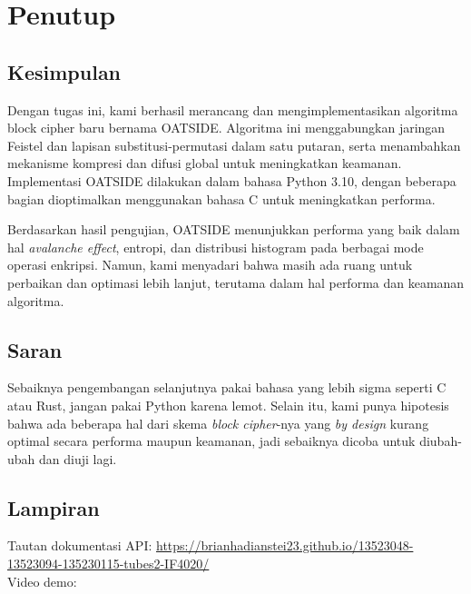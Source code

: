 \section{Penutup}
\subsection{Kesimpulan}
Dengan tugas ini, kami berhasil merancang dan mengimplementasikan algoritma block cipher baru bernama OATSIDE. Algoritma ini menggabungkan jaringan Feistel dan lapisan substitusi-permutasi dalam satu putaran, serta menambahkan mekanisme kompresi dan difusi global untuk meningkatkan keamanan. Implementasi OATSIDE dilakukan dalam bahasa Python 3.10, dengan beberapa bagian dioptimalkan menggunakan bahasa C untuk meningkatkan performa.

Berdasarkan hasil pengujian, OATSIDE menunjukkan performa yang baik dalam hal \textit{avalanche effect}, entropi, dan distribusi histogram pada berbagai mode operasi enkripsi. Namun, kami menyadari bahwa masih ada ruang untuk perbaikan dan optimasi lebih lanjut, terutama dalam hal performa dan keamanan algoritma.

\subsection{Saran}
Sebaiknya pengembangan selanjutnya pakai bahasa yang lebih sigma seperti C atau Rust, jangan pakai Python karena lemot. Selain itu, kami punya hipotesis bahwa ada beberapa hal dari skema \textit{block cipher}-nya yang \textit{by design} kurang optimal secara performa maupun keamanan, jadi sebaiknya dicoba untuk diubah-ubah dan diuji lagi. 

\subsection{Lampiran}
Tautan dokumentasi API: \href{https://brianhadianstei23.github.io/13523048-13523094-135230115-tubes2-IF4020/}{https://brianhadianstei23.github.io/13523048-13523094-135230115-tubes2-IF4020/}
\\ 
Video demo: 
\pagebreak